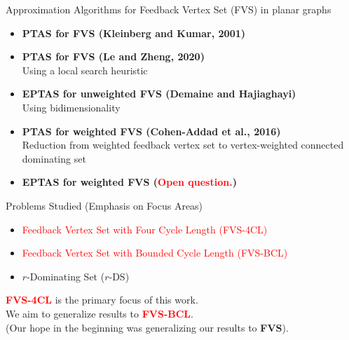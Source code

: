 \documentclass{beamer}
\begin{document}
\begin{frame}{Approximation Algorithms for Feedback Vertex Set (FVS) in planar graphs}

\begin{itemize}
    \item \textbf{PTAS for FVS (Kleinberg and Kumar, 2001)}
    \item \textbf{PTAS for FVS (Le and Zheng, 2020)}\\
    \small Using a local search heuristic
    \item \textbf{EPTAS for unweighted FVS (Demaine and Hajiaghayi)}\\
    \small Using bidimensionality
    \item \textbf{PTAS for weighted FVS (Cohen-Addad et al., 2016)}\\
    \small Reduction from weighted feedback vertex set
 to vertex-weighted connected dominating set
    \item \textbf{EPTAS for weighted FVS (\textcolor{red}{Open question.})}
\end{itemize}

\end{frame}

\begin{frame}{Problems Studied (Emphasis on Focus Areas)}

\begin{itemize}
    \item \textcolor{red}{Feedback Vertex Set with Four Cycle Length (FVS-4CL)}
    \item \textcolor{red}{Feedback Vertex Set with Bounded Cycle Length (FVS-BCL)}
    \item $r$-Dominating Set ($r$-DS)
\end{itemize}

\vspace{1em}
\small
\textcolor{red}{\textbf{FVS-4CL}} is the primary focus of this work.\\
We aim to generalize results to \textcolor{red}{\textbf{FVS-BCL}}.\\
(Our hope in the beginning was generalizing our results to \textcolor{red!50}{\textbf{FVS}}).
\end{frame}
\end{document}

